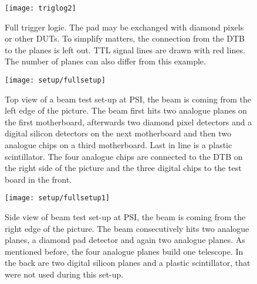 \begin{figure}[ht]
	\centering
	\texttt{[image: triglog2]}
	\caption{Full trigger logic. The pad may be exchanged with diamond pixels or other \ac{DUT}s. To simplify matters, the connection from the \ac{DTB} to the planes is left out. \ac{TTL} signal lines are drawn with red lines. The number of planes can also differ from this example.}
	\label{plogic2}
\end{figure}\no
\begin{figure}[ht]
	\centering
	\texttt{[image: setup/fullsetup]}
	\caption{Top view of a beam test set-up at \ac{PSI}, the beam is coming from the left edge of the picture. The beam first hits two analogue planes on the first motherboard, afterwards two diamond pixel detectors and a digital silicon detectors on the next motherboard and then two analogue chips on a third motherboard. Last in line is a plastic scintillator. The four analogue chips are connected to the \ac{DTB} on the right side of the picture and the three digital chips to the test board in the front.}
	\label{sdut1}
\end{figure}\no
\begin{figure}[ht]
	\centering
	\texttt{[image: setup/fullsetup1]}
	\caption{Side view of beam test set-up at \ac{PSI}, the beam is coming from the right edge of the picture. The beam consecutively hits two analogue planes, a diamond pad detector and again two analogue planes. As mentioned before, the four analogue planes build one telescope. In the back are two digital silicon planes and a plastic scintillator, that were not used during this set-up.}
	\label{sdut2}
\end{figure}\no

